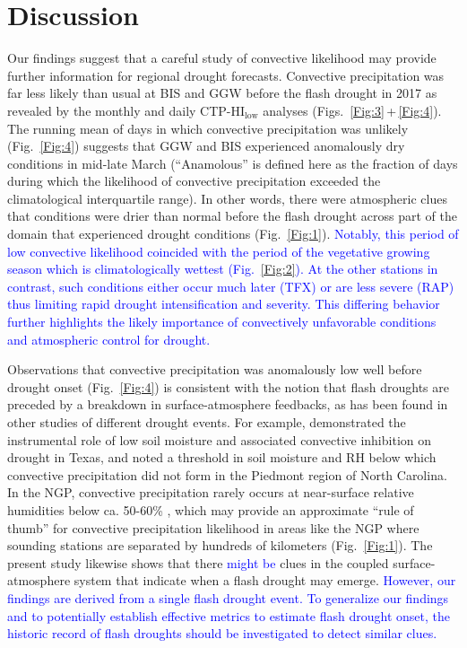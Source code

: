 \documentclass[hess, manuscript]{copernicus}
\def\TG{\textcolor{blue}}
\begin{document}
\section{Discussion}
Our findings suggest that a careful study of convective likelihood may provide further information for regional drought forecasts. Convective precipitation was far less likely than usual at BIS and GGW before the flash drought in 2017 as revealed by the monthly and daily CTP-$\mathrm{HI_{low}}$ analyses (Figs.~\ref{Fig:3}\,+\,\ref{Fig:4}). The running mean of days in which convective precipitation was unlikely (Fig.~\ref{Fig:4}) suggests that GGW and BIS experienced anomalously dry conditions in mid-late March (``Anamolous'' is defined here as the fraction of days during which the likelihood of convective precipitation exceeded the climatological interquartile range). In other words, there were atmospheric clues that conditions were drier than normal before the flash drought across part of the domain that experienced drought conditions (Fig.~\ref{Fig:1}). \TG{Notably, this period of low convective likelihood coincided with the period of the vegetative growing season which is climatologically wettest (Fig.~\ref{Fig:2}). At the other stations in contrast, such conditions either occur much later (TFX) or are less severe (RAP) thus limiting rapid drought intensification and severity. This differing behavior further highlights the likely importance of convectively unfavorable conditions and atmospheric control for drought.}      

Observations that convective precipitation was anomalously low well before drought onset (Fig.~\ref{Fig:4}) is consistent with the notion that flash droughts are preceded by a breakdown in surface-atmosphere feedbacks, as has been found in other studies of different drought events. For example, \citet{Myoung_2010a, Myoung_2010b} demonstrated the instrumental role of low soil moisture and associated convective inhibition on drought in Texas, and \citet{Juang_2007a} noted a threshold in soil moisture and RH below which convective precipitation did not form in the Piedmont region of North Carolina. In the NGP, convective precipitation rarely occurs at near-surface relative humidities below ca. 50-60\% \citep{Gerken_2018}, which may provide an approximate ``rule of thumb'' for convective precipitation likelihood in areas like the NGP where sounding stations are separated by hundreds of kilometers (Fig.~\ref{Fig:1}). The present study likewise shows that there \TG{might be} clues in the coupled surface-atmosphere system that indicate when a flash drought may emerge. \TG{However, our findings are derived from a single flash drought event. To generalize our findings and to potentially establish effective metrics to estimate flash drought onset, the historic record of flash droughts should be investigated to detect similar clues.}
\end{document}

